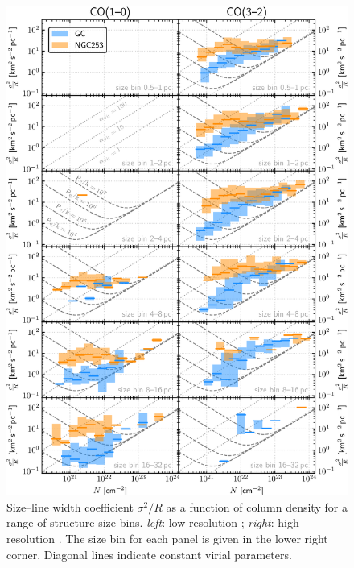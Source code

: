 \begin{figure}
    \centering
    \includegraphics[width=\textwidth]{images/chapters/papers/dendro/dendro_figD}
    \caption[Size--line width coefficient vs. column density relation split by size]{Size--line width coefficient $\sigma^2/R$ as a function of column density for a range of structure size bins. \emph{left}: low resolution ; \emph{right}: high resolution . The size bin for each panel is given in the lower right corner. Diagonal lines indicate constant virial parameters.
    \label{dendro: figure: D}}
\end{figure}


